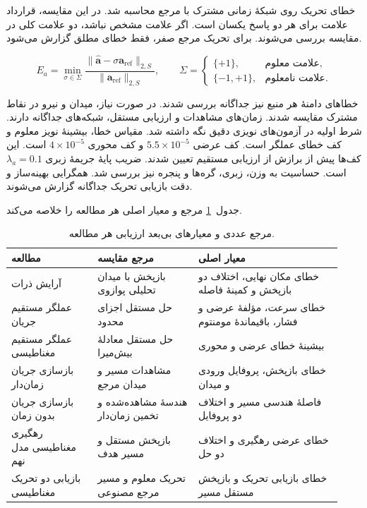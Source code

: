 خطای تحریک روی شبکهٔ زمانی مشترک با مرجع محاسبه شد.
در این مقایسه، قرارداد علامت برای هر دو پاسخ یکسان است.
اگر علامت مشخص نباشد، دو علامت کلی در مقایسه بررسی می‌شوند.
برای تحریک مرجع صفر، فقط خطای مطلق گزارش می‌شود.

\begin{equation}
E_a=
\min_{\sigma\in\Sigma}
\frac{\|\widehat{\mathbf a}-\sigma\mathbf a_{\mathrm{ref}}\|_{2,S}}
{\|\mathbf a_{\mathrm{ref}}\|_{2,S}},
\qquad
\Sigma=
\begin{cases}
\{+1\}, & \text{علامت معلوم},\\
\{-1,+1\}, & \text{علامت نامعلوم}.
\end{cases}
\label{eq:validation-master10-proposed-recovery}
\end{equation}

خطاهای دامنهٔ هر منبع نیز جداگانه بررسی شدند.
در صورت نیاز، میدان و نیرو در نقاط مشترک مقایسه شدند.
زمان‌های مشاهدات و ارزیابی مستقل، شبکه‌های جداگانه دارند.
شرط اولیه در آزمون‌های نویزی دقیق نگه داشته شد.
مقیاس خطا، بیشینهٔ نویز معلوم و کف خطای عملگر است.
کف عرضی $5.5\times10^{-5}$ و کف محوری $4\times10^{-5}$ است.
این کف‌ها پیش از برازش از ارزیابی مستقیم تعیین شدند.
ضریب پایهٔ جریمهٔ زبری $\lambda_a=0.1$ است.
حساسیت به وزن، زبری، گره‌ها و پنجره نیز بررسی شد.
همگرایی بهینه‌ساز و دقت بازیابی تحریک جداگانه گزارش می‌شوند.

جدول~\ref{tab:validation-summary} مرجع و معیار اصلی هر مطالعه را خلاصه می‌کند.

\begin{table}[htbp]
\centering
\small
\caption{مرجع عددی و معیارهای بی‌بعد ارزیابی هر مطالعه.}
\label{tab:validation-summary}
\begin{tabular}{@{}p{0.24\linewidth}p{0.29\linewidth}p{0.40\linewidth}@{}}
\hline
\textbf{مطالعه} & \textbf{مرجع مقایسه} & \textbf{معیار اصلی}\\
\hline
آرایش ذرات &
بازپخش با میدان تحلیلی پوازوی &
خطای مکان نهایی، اختلاف دو بازپخش و کمینهٔ فاصله\\
عملگر مستقیم جریان &
حل مستقل اجزای محدود &
خطای سرعت، مؤلفهٔ عرضی و فشار، باقیماندهٔ مومنتوم\\
عملگر مستقیم مغناطیسی &
حل مستقل معادلهٔ بیش‌میرا &
بیشینهٔ خطای عرضی و محوری\\
بازسازی جریان زمان‌دار &
مشاهدات مسیر و میدان مرجع &
خطای بازپخش، پروفایل ورودی و میدان\\
بازسازی جریان بدون زمان &
هندسهٔ مشاهده‌شده و تخمین زمان‌دار &
فاصلهٔ هندسی مسیر و اختلاف دو پروفایل\\
رهگیری مغناطیسی مدل نهم &
بازپخش مستقل و مسیر هدف &
خطای عرضی رهگیری و اختلاف دو حل\\
بازیابی دو تحریک مغناطیسی &
تحریک معلوم و مسیر مرجع مصنوعی &
خطای بازیابی تحریک و بازپخش مستقل مسیر\\
\hline
\end{tabular}
\end{table}
